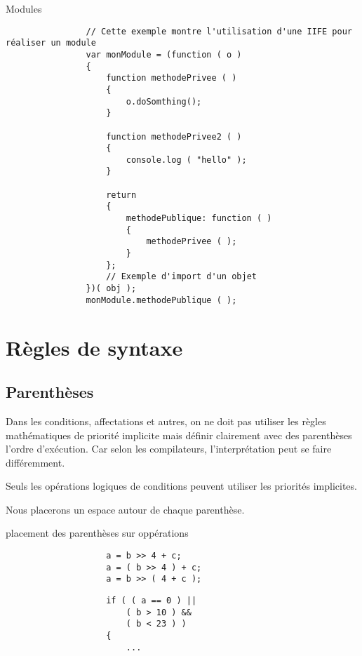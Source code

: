 		\begin{cbox}{Modules}
			\begin{verbatim}
				// Cette exemple montre l'utilisation d'une IIFE pour réaliser un module
				var monModule = (function ( o )
				{
				    function methodePrivee ( )
				    {
				        o.doSomthing();
				    }

				    function methodePrivee2 ( )
				    {
				        console.log ( "hello" );
				    }

				    return
				    {
				        methodePublique: function ( )
				        {
				            methodePrivee ( );
				        }
				    };
				    // Exemple d'import d'un objet
				})( obj );
				monModule.methodePublique ( );
			\end{verbatim}
		\end{cbox}

	\section{Règles de syntaxe}
		\subsection{Parenthèses}
			Dans les conditions, affectations et autres, on ne doit pas utiliser les règles mathématiques de priorité implicite mais définir clairement avec des parenthèses l'ordre d'exécution. Car selon les compilateurs, l'interprétation peut se faire différemment.

			Seuls les opérations logiques de conditions peuvent utiliser les priorités implicites.

			Nous placerons un espace autour de chaque parenthèse.

			\begin{cbox}{placement des parenthèses sur oppérations}
				\begin{verbatim}
					a = b >> 4 + c;
					a = ( b >> 4 ) + c;
					a = b >> ( 4 + c );
				\end{verbatim}

				\begin{changemargin}{-2.5cm}{-2.5cm}
				\begin{tcolorbox}
				\begin{verbatim}
					if ( ( a == 0 ) ||
					    ( b > 10 ) &&
					    ( b < 23 ) )
					{
					    ...
				\end{verbatim}
				\end{tcolorbox}
				\end{changemargin}
				\caption{placement des parenthèses sur conditions}
			\end{cbox}

